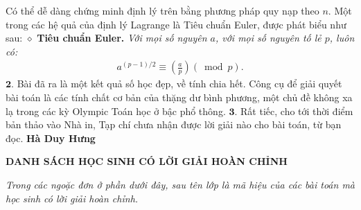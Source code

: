 \begin{multicols}{2}
	Có thể dễ dàng chứng minh định lý trên bằng phương pháp quy nạp theo $n$.
	\vskip 0.05cm
	Một trong các hệ quả của định lý Lagrange là Tiêu chuẩn Euler, được phát biểu như sau:
	\vskip 0.05cm
	$\diamond$ \textbf{\color{thachthuctoanhoc}Tiêu chuẩn Euler.} \textit{Với mọi số nguyên $a$, với mọi số nguyên tố lẻ $p$, luôn có:}
	\begin{align*}
		{a^{\left( {p - 1} \right)/2}} \equiv \left( {\frac{a}{p}} \right)\left( {\bmod p} \right).
	\end{align*}
	$\pmb{2.}$ Bài đã ra là một kết quả số học đẹp, về tính chia hết. Công cụ để giải quyết bài toán là các tính chất cơ bản của thặng dư bình phương, một chủ đề không xa lạ trong các kỳ Olympic Toán học ở bậc phổ thông.
	\vskip 0.05cm
	$\pmb{3.}$ Rất tiếc, cho tới thời điểm bản thảo vào Nhà in, Tạp chí chưa nhận được lời giải nào cho bài toán, từ bạn đọc.
	\vskip 0.05cm
	\hfill	\textbf{\color{thachthuctoanhoc}\color{thachthuctoanhoc}Hà Duy Hưng}
\end{multicols}
\begin{center}
	\textbf{\color{thachthuctoanhoc}DANH SÁCH HỌC SINH CÓ LỜI GIẢI HOÀN CHỈNH}
\end{center}
\textit{Trong các ngoặc đơn ở phần dưới đây, sau tên lớp là mã hiệu của các bài toán mà học sinh có lời giải hoàn chỉnh.}
